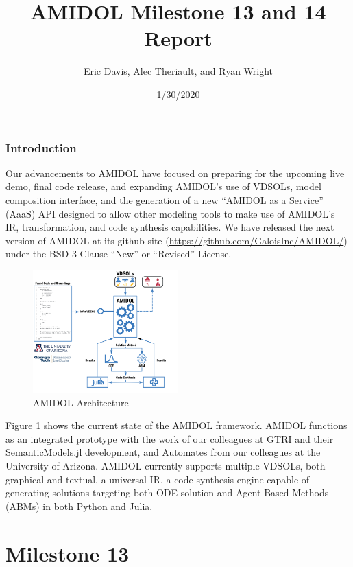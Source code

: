 \documentclass[12pt]{galois-whitepaper}
\author{Eric Davis, Alec Theriault, and Ryan Wright}
\title{AMIDOL Milestone 13 and 14 Report}
\date{1/30/2020}
\begin{document}
\maketitle

\vspace*{2cm}
\tableofcontents

\newpage

\section{Introduction}

Our advancements to AMIDOL have focused on preparing for the upcoming
live demo, final code release, and expanding AMIDOL's use of VDSOLs,
model composition interface, and the generation of a new ``AMIDOL as a
Service'' (AaaS) API designed to allow other modeling tools to make
use of AMIDOL's IR, transformation, and code synthesis capabilities.
We have released the next version of AMIDOL at its github site
(\url{https://github.com/GaloisInc/AMIDOL/}) under the BSD 3-Clause
``New'' or ``Revised'' License.

\begin{figure}
  \centering
  \includegraphics[width=0.5\textwidth]{figs/AMIDOL-architecture.png}
  \caption{AMIDOL Architecture}
  \label{Fig:Arch} 
\end{figure}

Figure \ref{Fig:Arch} shows the current state of the AMIDOL
framework.  AMIDOL functions as an integrated prototype with the work
of our colleagues at GTRI and their SemanticModels.jl development, and
Automates from our colleagues at the University of Arizona.  AMIDOL
currently supports multiple VDSOLs, both graphical and textual, a
universal IR, a code synthesis engine capable of generating solutions
targeting both ODE solution and Agent-Based Methods (ABMs) in both
Python and Julia.

\part{Milestone 13}
\end{document}
